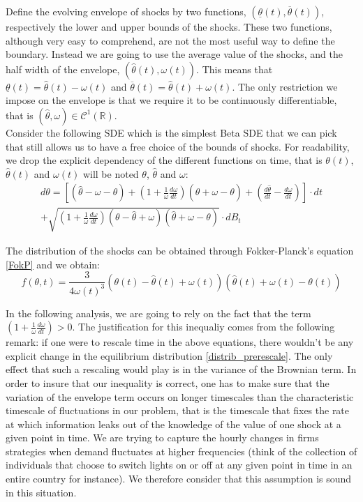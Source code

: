 Define the evolving envelope of shocks by two functions, $(\underline{\theta}(t),\overline{\theta}(t))$, respectively the lower and upper bounds of the shocks. These two functions, although very easy to comprehend, are not the most useful way to define the boundary. Instead we are going to use the average value of the shocks, and the half width of the envelope, $(\hat{\theta}(t), \omega(t))$. This means that $\underline{\theta}(t)=\hat{\theta}(t)-\omega(t)$ and $\overline{\theta}(t)=\hat{\theta}(t)+\omega(t)$. The only restriction we impose on the envelope is that we require it to be continuously differentiable, that is $(\hat{\theta},\omega)\in\mathcal{C}^1(\mathbb{R})$.\\

Consider the following SDE which is the simplest Beta SDE that we can pick that still allows us to have a free choice of the bounds of shocks. For readability, we drop the explicit dependency of the different functions on time, that is $\theta(t)$, $\hat{\theta}(t)$ and $\omega(t)$ will be noted $\theta$, $\hat{\theta}$ and $\omega$:
\begin{equation}
\begin{split}
  d\theta=\left[(\hat{\theta}-\omega-\theta)+\left(1+\frac{1}{\omega}\frac{d\omega}{dt}\right)(\hat{\theta}+\omega-\theta)+\left(\frac{d\hat{\theta}}{dt}-\frac{d\omega}{dt}\right)\right]\cdot dt\\+\sqrt{\left(1+\frac{1}{\omega}\frac{d\omega}{dt}\right)(\theta-\hat{\theta}+\omega)(\hat{\theta}+\omega-\theta)}\cdot dB_{t}
\end{split}
\end{equation}

The distribution of the shocks can be obtained through Fokker-Planck's equation \ref{FokP} and we obtain:
\begin{equation}
f(\theta,t)=\frac{3}{4\omega(t)^3}(\theta(t)-\hat{\theta}(t)+\omega(t))(\hat{\theta}(t)+\omega(t)-\theta(t))
\label{distrib_prerescale}
\end{equation}

In the following analysis, we are going to rely on the fact that the term $\left(1+\frac{1}{\omega}\frac{d\omega}{dt}\right)>0$. The justification for this inequaliy comes from the following remark: if one were to rescale time in the above equations, there wouldn't be any explicit change in the equilibrium distribution \ref{distrib_prerescale}. The only effect that such a rescaling would play is in the variance of the Brownian term. In order to insure that our inequality is correct, one has to make sure that the variation of the envelope term occurs on longer timescales than the characteristic timescale of fluctuations in our problem, that is the timescale that fixes the rate at which information leaks out of the knowledge of the value of one shock at a given point in time. We are trying to capture the hourly changes in firms strategies when demand fluctuates at higher frequencies (think of the collection of individuals that choose to switch lights on or off at any given point in time in an entire country for instance). We therefore consider that this assumption is sound in this situation.\\


